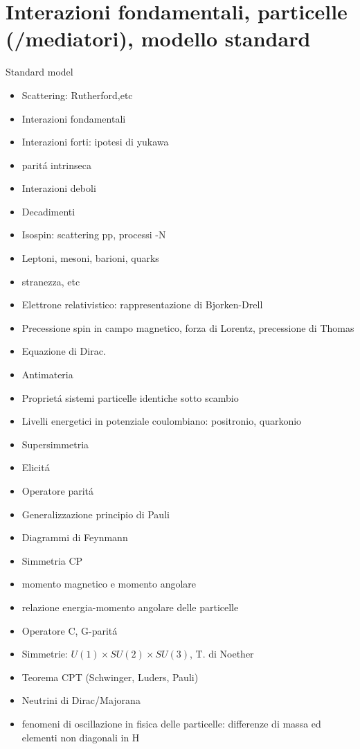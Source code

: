 \documentclass[10pt,xcolor={usenames},fleqn,mathserif,serif]{beamer}
\begin{document}
\part{Interazioni fondamentali, particelle (/mediatori), modello standard}
\begin{wordonframe}{Standard model}
\begin{itemize}
\item Scattering: Rutherford,etc
\item Interazioni fondamentali
\item Interazioni forti: ipotesi di yukawa
\item parit\'a intrinseca \Ppi
\item Interazioni deboli
\item Decadimenti
\item Isospin: scattering pp, processi \Ppi-N
\item Leptoni, mesoni, barioni, quarks
\item stranezza, etc
\item Elettrone relativistico: rappresentazione di Bjorken-Drell
\item Precessione spin in campo magnetico, forza di Lorentz, precessione di Thomas
\item Equazione di Dirac.
\item Antimateria
\item Propriet\'a sistemi particelle identiche sotto scambio
\item Livelli energetici in potenziale coulombiano: positronio, quarkonio
\item Supersimmetria
\item Elicit\'a
\item Operatore parit\'a
\item Generalizzazione principio di Pauli
\item Diagrammi di Feynmann
\item Simmetria CP
\item momento magnetico e momento angolare
\item relazione energia-momento angolare delle particelle
\item Operatore C, G-parit\'a
\item Simmetrie: $U(1)\times SU(2)\times SU(3)$, T. di Noether
\item Teorema CPT (Schwinger, Luders, Pauli)
\item Neutrini di Dirac/Majorana
\item fenomeni di oscillazione in fisica delle particelle: differenze di massa ed elementi non diagonali in H
\end{itemize}
\end{wordonframe}

\end{document}
